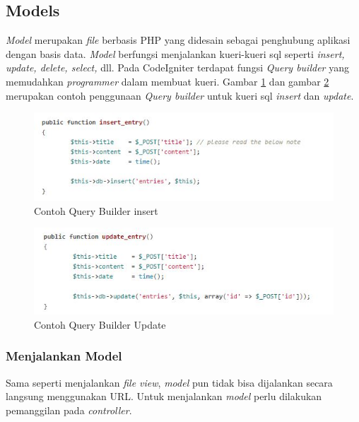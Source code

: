 		\subsection{Models}
		\label{sub: models}
		
		\textit{Model} merupakan \textit{file} berbasis PHP yang didesain sebagai penghubung aplikasi dengan basis data. \textit{Model} berfungsi menjalankan kueri-kueri sql seperti \textit{insert, update, delete, select,} dll.
		Pada CodeIgniter terdapat fungsi \textit{Query builder} yang memudahkan \textit{programmer} dalam membuat kueri. Gambar \ref{fig:insert} dan gambar \ref{fig:update} merupakan contoh penggunaan \textit{Query builder} untuk kueri sql \textit{insert} dan \textit{update}.
		
		\begin{figure}[H]
			\centering
			\includegraphics[scale=1]{Gambar/insert}
			\caption{Contoh Query Builder insert}
			\label{fig:insert}
		\end{figure}
		
		\begin{figure}[H]
			\centering
			\includegraphics[scale=1]{Gambar/update}
			\caption{Contoh Query Builder Update}
			\label{fig:update}
		\end{figure}
		
		\subsubsection{Menjalankan Model}
		\label{subsub: menjalankanModel}
			
		Sama seperti menjalankan \textit{file view}, \textit{model} pun tidak bisa dijalankan secara langsung menggunakan URL. Untuk menjalankan \textit{model} perlu dilakukan pemanggilan pada \textit{controller}.
		
